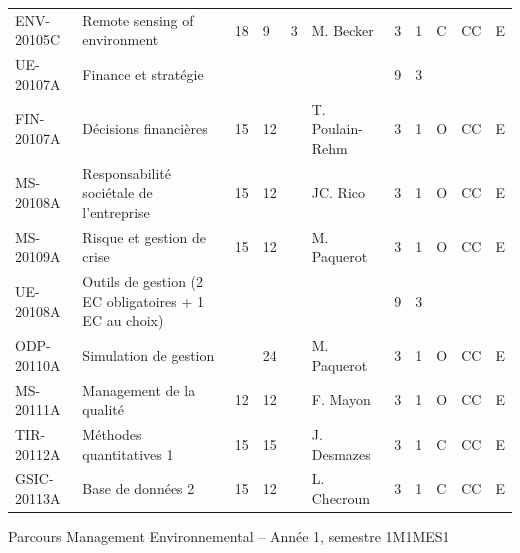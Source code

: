 \documentclass[a4paper,11pt]{article}
\begin{document}
{{\begin{tabular}{lllllllllll}
ENV-20105C                            & \cellcolor[HTML]{FD6864}Remote sensing of environment                   & 18 & 9  & 3  & \cellcolor[HTML]{FD6864}M. Becker  & 3    & 1    & C           & CC             & E         \\
\rowcolor[HTML]{EFEFEF} 
\cellcolor[HTML]{FD6864}UE-20107A     & Finance et stratégie                                                    &    &    &    &                                    & 9    & 3    &             &                &           \\
\cellcolor[HTML]{FD6864}FIN-20107A    & Décisions financières                                                   & 15 & 12 &    & T. Poulain-Rehm                    & 3    & 1    & O           & CC             & E         \\
\cellcolor[HTML]{FD6864}MS-20108A     & Responsabilité sociétale de l'entreprise                                & 15 & 12 &    & JC. Rico                           & 3    & 1    & O           & CC             & E         \\
\cellcolor[HTML]{FD6864}MS-20109A     & Risque et gestion de crise                                              & 15 & 12 &    & M. Paquerot                        & 3    & 1    & O           & CC             & E         \\
\rowcolor[HTML]{EFEFEF} 
\cellcolor[HTML]{FD6864}UE-20108A     & Outils de gestion (2 EC obligatoires + 1 EC au choix)                   &    &    &    &                                    & 9    & 3    &             &                &           \\
\cellcolor[HTML]{FD6864}ODP-20110A    & Simulation de gestion                                                   &    & 24 &    & M. Paquerot                        & 3    & 1    & O           & CC             & E         \\
\cellcolor[HTML]{FD6864}MS-20111A     & Management de la qualité                                                & 12 & 12 &    & F. Mayon                           & 3    & 1    & O           & CC             & E         \\
\cellcolor[HTML]{FD6864}TIR-20112A    & Méthodes quantitatives 1                                                & 15 & 15 &    & J. Desmazes                        & 3    & 1    & C           & CC             & E         \\
\cellcolor[HTML]{FD6864}GSIC-20113A   & Base de données 2                                                       & 15 & 12 &    & L. Checroun                        & 3    & 1    & C           & CC             & E         
\end{tabular}}
}{Parcours Management Environnemental -- Année 1, semestre 1}{M1MES1}
\end{document}
